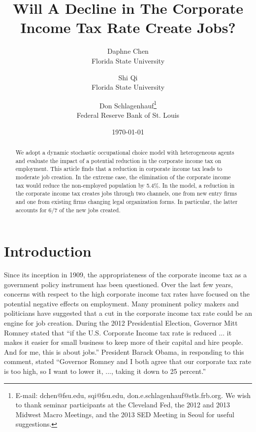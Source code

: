 \documentclass[12pt]{article}
\begin{document}
\title{Will A Decline in The Corporate Income Tax Rate Create Jobs?\vspace{0.5cm}}

\author{Daphne Chen \\
Florida State University \and Shi Qi\\
Florida State University \vspace{0.5cm} \and Don Schlagenhauf\thanks{%
E-mail: dchen@fsu.edu, sqi@fsu.edu, don.e.schlagenhauf@stls.frb.org. We wish to thank
seminar participants at the Cleveland Fed, the 2012 and 2013 Midwest Macro Meetings, and the 2013 SED Meeting in Seoul for useful suggestions.} \\ Federal Reserve Bank of St. Louis}
\date{\vspace{0.5cm}\today }
\maketitle


\begin{abstract}

We adopt a dynamic stochastic occupational choice model with heterogeneous agents and evaluate the impact of a potential reduction in the corporate income tax on employment. This article finds that a reduction in corporate income tax leads to moderate job creation. In the extreme case, the elimination of the corporate income tax would reduce the non-employed population by 5.4\%. In the model, a reduction in the corporate income tax creates jobs through two channels, one from new entry firms and one from existing firms changing legal organization forms. In particular, the latter accounts for 6/7 of the new jobs created. 

\end{abstract}

\newpage


\onehalfspacing

\section{Introduction}

Since its inception in 1909, the appropriateness of the corporate income tax
as a government policy instrument has been questioned. Over the last few years, concerns
with respect to the high corporate income tax rates have focused on the
potential negative effects on employment. Many prominent policy makers and
politicians have suggested that a cut in the corporate income tax rate could
be an engine for job creation. During the 2012 Presidential Election,
Governor Mitt Romney stated that ``if the U.S. Corporate Income tax rate is
reduced ... it makes it easier for small business to keep more of their
capital and hire people. And for me, this is about jobs.'' President Barack
Obama, in responding to this comment, stated ``Governor Romney and I both
agree that our corporate tax rate is too high, so I want to lower it, ...,
taking it down to 25 percent.'' 
\end{document}
